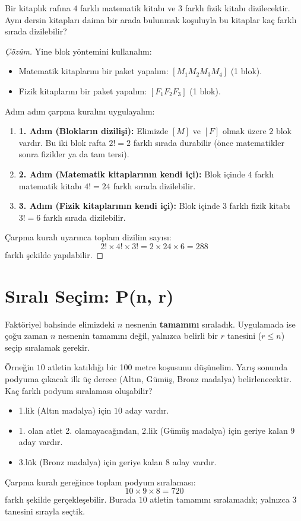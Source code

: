 \begin{example}
Bir kitaplık rafına $4$ farklı matematik kitabı ve $3$ farklı fizik kitabı dizilecektir. Aynı dersin kitapları daima bir arada bulunmak koşuluyla bu kitaplar kaç farklı sırada dizilebilir?
\end{example}
\begin{proof}[Çözüm]
Yine blok yöntemini kullanalım:
\begin{itemize}
  \item Matematik kitaplarını bir paket yapalım: $[M_1 M_2 M_3 M_4]$ (1 blok).
  \item Fizik kitaplarını bir paket yapalım: $[F_1 F_2 F_3]$ (1 blok).
\end{itemize}
Adım adım çarpma kuralını uygulayalım:
\begin{enumerate}
  \item \textbf{1. Adım (Blokların dizilişi):} Elimizde $[M]$ ve $[F]$ olmak üzere $2$ blok vardır. Bu iki blok rafta $2! = 2$ farklı sırada durabilir (önce matematikler sonra fizikler ya da tam tersi).
  \item \textbf{2. Adım (Matematik kitaplarının kendi içi):} Blok içinde $4$ farklı matematik kitabı $4! = 24$ farklı sırada dizilebilir.
  \item \textbf{3. Adım (Fizik kitaplarının kendi içi):} Blok içinde $3$ farklı fizik kitabı $3! = 6$ farklı sırada dizilebilir.
\end{enumerate}
Çarpma kuralı uyarınca toplam dizilim sayısı:
\[ 2! \times 4! \times 3! = 2 \times 24 \times 6 = 288 \]
farklı şekilde yapılabilir.
\end{proof}


\section{Sıralı Seçim: P(n, r)}

Faktöriyel bahsinde elimizdeki $n$ nesnenin \textbf{tamamını} sıraladık. Uygulamada ise çoğu zaman $n$ nesnenin tamamını değil, yalnızca belirli bir $r$ tanesini ($r \le n$) seçip sıralamak gerekir.

Örneğin $10$ atletin katıldığı bir 100 metre koşusunu düşünelim. Yarış sonunda podyuma çıkacak ilk üç derece (Altın, Gümüş, Bronz madalya) belirlenecektir. Kaç farklı podyum sıralaması oluşabilir?
\begin{itemize}
  \item 1.lik (Altın madalya) için $10$ aday vardır.
  \item 1. olan atlet 2. olamayacağından, 2.lik (Gümüş madalya) için geriye kalan $9$ aday vardır.
  \item 3.lük (Bronz madalya) için geriye kalan $8$ aday vardır.
\end{itemize}
Çarpma kuralı gereğince toplam podyum sıralaması:
\[ 10 \times 9 \times 8 = 720 \]
farklı şekilde gerçekleşebilir. Burada $10$ atletin tamamını sıralamadık; yalnızca $3$ tanesini sırayla seçtik.

